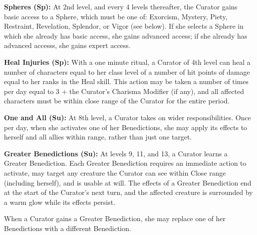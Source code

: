 \textbf{Spheres (Sp):} At 2nd level, and every 4 levels thereafter, the Curator gains basic access to a Sphere, which must be one of: Exorcism, Mystery, Piety, Restraint, Revelation, Splendor, or Vigor (see below). If she selects a Sphere in which she already has basic access, she gains advanced access; if she already has advanced accesss, she gains expert access.

\textbf{Heal Injuries (Sp):} With a one minute ritual, a Curator of 4th level can heal a number of characters equal to her class level of a number of hit points of damage equal to her ranks in the Heal skill. This action may be taken a number of times per day equal to 3 + the Curator's Charisma Modifier (if any), and all affected characters must be within close range of the Curator for the entire period.

\textbf{One and All (Su):} At 8th level, a Curator takes on wider responsibilities. Once per day, when she activates one of her Benedictions, she may apply its effects to herself and all allies within range, rather than just one target.

\textbf{Greater Benedictions (Su):} At levels 9, 11, and 13, a Curator learns a Greater Benediction. Each Greater Benediction requires an immediate action to activate, may target any creature the Curator can see within Close range (including herself), and is usable at will. The effects of a Greater Benediction end at the start of the Curator's next turn, and the affected creature is surrounded by a warm glow while its effects persist.

When a Curator gains a Greater Benediction, she may replace one of her Benedictions with a different Benediction.

